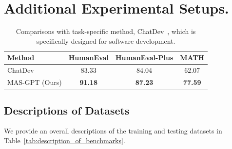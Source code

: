 \documentclass{article}
\theoremstyle{plain}
\theoremstyle{definition}
\theoremstyle{remark}
\begin{document}
\section{Additional Experimental Setups.}

\begin{table}[t]
    \centering
    \begin{small}
    \begin{sc}
    \begin{tabular}{l|cc|c}
        \toprule
        Method & HumanEval & HumanEval-Plus & MATH \\
        \midrule
        ChatDev~\cite{qian2024chatdev} & 83.33 & 84.04 & 62.07\\
        MAS-GPT (Ours) & \textbf{91.18} & \textbf{87.23} & \textbf{77.59}\\
        \bottomrule
    \end{tabular}
    \end{sc}
    \end{small}
    \caption{Comparisons with task-specific method, ChatDev~\cite{qian2024chatdev}, which is specifically designed for software development.}
    \label{tab:chatdev}
\end{table}

\subsection{Descriptions of Datasets}

We provide an overall descriptions of the training and testing datasets in Table~\ref{tab:description_of_benchmarks}.
\end{document}
